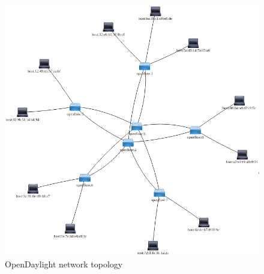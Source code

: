 \begin{figure}[h!]
 \centering
 \includegraphics[width=\linewidth]{images/odltopo.png}
 \caption{OpenDaylight network topology}
 \label{fig:odltopo}
\end{figure}

